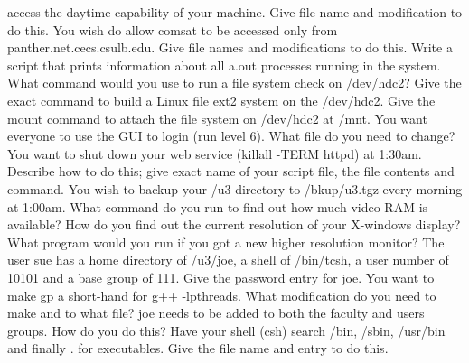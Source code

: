 access the {\ltt{}daytime} capability of your machine.
Give file name and modification to do this.
\vskip 0.8in
You wish do allow {\ltt{}comsat} to be accessed only from
{\ltt{}panther.net.cecs.csulb.edu}.
Give file names and modifications to do this.
\vskip 1.4in
\vfill\eject
\ques
Write a script that prints information about all {\ltt{}a.out} processes
running in the system.
\vskip 1.5in
\ques
What command would you use to run a file system check on
{\ltt{}/dev/hdc2}?
\vskip 0.4in
Give the exact command to build a Linux file ext2 system on the
{\ltt{}/dev/hdc2}.
\vskip 0.4in
Give the mount command to attach the file system
on {\ltt{}/dev/hdc2} at {\ltt{}/mnt}.
\vskip 0.4in
\ques
You want everyone to use the GUI to login (run level 6).
What file do you need to change?
\vskip 0.4in
You want to shut down your web service ({\ltt{}killall -TERM httpd})
at 1:30am.
Describe how to do this; give exact name of your script file, the file contents
and command.
\vskip 1.7in
You wish to backup your {\ltt{}/u3} directory to {\ltt{}/bkup/u3.tgz}
every morning at 1:00am. 
\vskip 1.4in
\vfill\eject
\ques
What command do you run to find out how much video RAM is available?
\vskip 0.4in
How do you find out the current resolution of your X-windows display?
\vskip 0.4in
What program would you run if you got a new higher resolution monitor?
\vskip 0.4in
\ques
The user {\ltt{}sue} has  a home directory of {\ltt{}/u3/joe},
a shell of {\ltt{}/bin/tcsh}, a user number of {\ltt{}10101}
and a base group of {\ltt{}111}.
Give the password entry for {\ltt{}joe}.
\vskip 1.0in
\ques
You want to make {\ltt{}gp} a short-hand for {\ltt{}g++ -lpthreads}.
What modification do you need to make and to what file?
\vskip 1.2in
{\ltt{}joe} needs to be added to both the {\ltt{}faculty} and {\ltt{}users}
groups.
How do you do this?
\vskip 1.2in
Have your shell ({\ltt{}csh}) search {\ltt{}/bin}, {\ltt{}/sbin},
{\ltt{}/usr/bin} and finally {\ltt{}.} for executables.
Give the file name and entry to do this.
\vskip 1.2in
\bye
